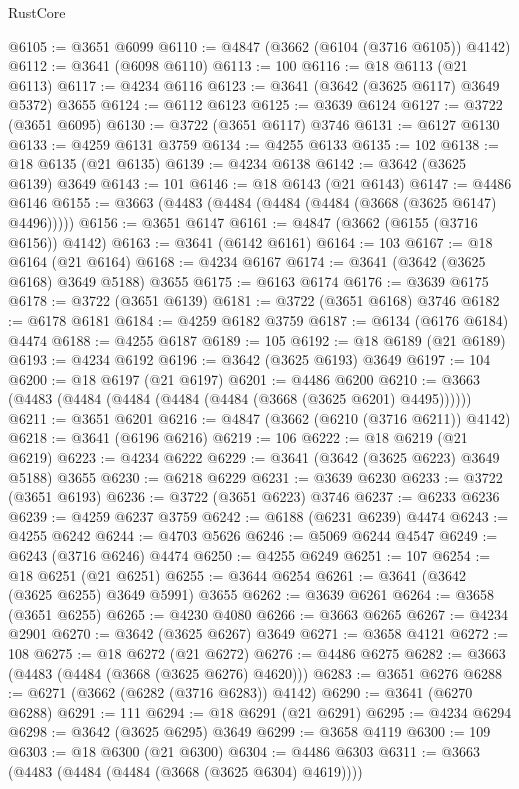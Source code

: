 \begin{lexlean}{RustCore}
\begin{coremodule}
@6105 := @3651 @6099
@6110 := @4847 (@3662 (@6104 (@3716 @6105)) @4142)
@6112 := @3641 (@6098 @6110)
@6113 := 100
@6116 := @18 @6113 (@21 @6113)
@6117 := @4234 @6116
@6123 := @3641 (@3642 (@3625 @6117) @3649 @5372) @3655
@6124 := @6112 @6123
@6125 := @3639 @6124
@6127 := @3722 (@3651 @6095)
@6130 := @3722 (@3651 @6117) @3746
@6131 := @6127 @6130
@6133 := @4259 @6131 @3759
@6134 := @4255 @6133
@6135 := 102
@6138 := @18 @6135 (@21 @6135)
@6139 := @4234 @6138
@6142 := @3642 (@3625 @6139) @3649
@6143 := 101
@6146 := @18 @6143 (@21 @6143)
@6147 := @4486 @6146
@6155 := @3663 (@4483 (@4484 (@4484 (@4484 (@3668 (@3625 @6147) @4496)))))
@6156 := @3651 @6147
@6161 := @4847 (@3662 (@6155 (@3716 @6156)) @4142)
@6163 := @3641 (@6142 @6161)
@6164 := 103
@6167 := @18 @6164 (@21 @6164)
@6168 := @4234 @6167
@6174 := @3641 (@3642 (@3625 @6168) @3649 @5188) @3655
@6175 := @6163 @6174
@6176 := @3639 @6175
@6178 := @3722 (@3651 @6139)
@6181 := @3722 (@3651 @6168) @3746
@6182 := @6178 @6181
@6184 := @4259 @6182 @3759
@6187 := @6134 (@6176 @6184) @4474
@6188 := @4255 @6187
@6189 := 105
@6192 := @18 @6189 (@21 @6189)
@6193 := @4234 @6192
@6196 := @3642 (@3625 @6193) @3649
@6197 := 104
@6200 := @18 @6197 (@21 @6197)
@6201 := @4486 @6200
@6210 := @3663 (@4483 (@4484 (@4484 (@4484 (@4484 (@3668 (@3625 @6201) @4495))))))
@6211 := @3651 @6201
@6216 := @4847 (@3662 (@6210 (@3716 @6211)) @4142)
@6218 := @3641 (@6196 @6216)
@6219 := 106
@6222 := @18 @6219 (@21 @6219)
@6223 := @4234 @6222
@6229 := @3641 (@3642 (@3625 @6223) @3649 @5188) @3655
@6230 := @6218 @6229
@6231 := @3639 @6230
@6233 := @3722 (@3651 @6193)
@6236 := @3722 (@3651 @6223) @3746
@6237 := @6233 @6236
@6239 := @4259 @6237 @3759
@6242 := @6188 (@6231 @6239) @4474
@6243 := @4255 @6242
@6244 := @4703 @5626
@6246 := @5069 @6244 @4547
@6249 := @6243 (@3716 @6246) @4474
@6250 := @4255 @6249
@6251 := 107
@6254 := @18 @6251 (@21 @6251)
@6255 := @3644 @6254
@6261 := @3641 (@3642 (@3625 @6255) @3649 @5991) @3655
@6262 := @3639 @6261
@6264 := @3658 (@3651 @6255)
@6265 := @4230 @4080
@6266 := @3663 @6265
@6267 := @4234 @2901
@6270 := @3642 (@3625 @6267) @3649
@6271 := @3658 @4121
@6272 := 108
@6275 := @18 @6272 (@21 @6272)
@6276 := @4486 @6275
@6282 := @3663 (@4483 (@4484 (@3668 (@3625 @6276) @4620)))
@6283 := @3651 @6276
@6288 := @6271 (@3662 (@6282 (@3716 @6283)) @4142)
@6290 := @3641 (@6270 @6288)
@6291 := 111
@6294 := @18 @6291 (@21 @6291)
@6295 := @4234 @6294
@6298 := @3642 (@3625 @6295) @3649
@6299 := @3658 @4119
@6300 := 109
@6303 := @18 @6300 (@21 @6300)
@6304 := @4486 @6303
@6311 := @3663 (@4483 (@4484 (@4484 (@3668 (@3625 @6304) @4619))))

\end{coremodule}
\end{lexlean}
